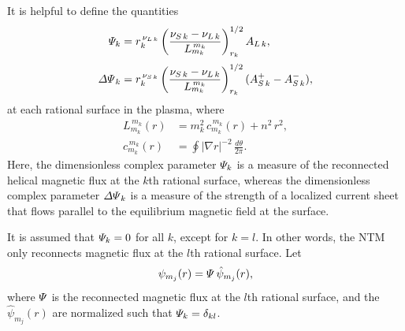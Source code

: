 \documentclass[12pt,prb,aps]{revtex4-1}
\begin{document}
It is helpful to define the quantities\,\cite{tear9}
\begin{align}\label{Psidef}
{\mit\Psi}_k&= r_k^{\,\nu_{L\,k}}\left(\frac{\nu_{S\,k}-\nu_{L\,k}}{L_{m_k}^{\,{m_k}}}\right)^{1/2}_{r_k} A_{L\,k},\\[0.5ex]
{\mit\Delta\Psi}_k &= r_k^{\,\nu_{S\,k}}\left(\frac{\nu_{S\,k}-\nu_{L\,k}}{L_{m_k}^{\,m_k}}\right)^{1/2}_{r_k} (A_{S\,k}^+-A_{S\,k}^-),\label{edpp}
\end{align}
at each rational surface in the plasma, where
\begin{align}
L_{m_k}^{\,m_k}(r) &= m_k^2\,c_{m_k}^{\,m_k}(r) + n^2\,r^2,\\[0.5ex]
c_{m_k}^{\,m_k}(r) &=\oint|\nabla r|^{-2}\,\frac{d\theta}{2\pi}.
\end{align}
 Here, the dimensionless complex parameter ${\mit\Psi}_k$ is a measure of the reconnected helical magnetic flux at the $k$th rational surface, whereas
the dimensionless complex parameter ${\mit\Delta\Psi}_k$ is a measure of the strength of a localized current sheet that flows parallel to the equilibrium magnetic field at the surface.

 It is assumed that ${\mit\Psi}_k = 0$ for all $k$, except for $k=l$. In other words, the NTM only reconnects magnetic flux at the
$l$th rational surface. Let 
\begin{equation}
\psi_{m_j}(r) = {\mit\Psi}\,\hat{\psi}_{m_j}(r),
\end{equation}
where ${\mit\Psi}$ is the reconnected magnetic flux at the $l$th rational surface, and the $\hat{\psi}_{m_j}(r)$ are normalized such that ${\mit\Psi}_k
= \delta_{kl}$. 
\end{document}
